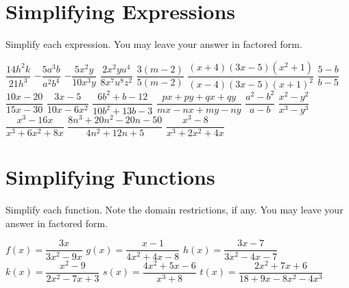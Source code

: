 \section*{Simplifying Expressions}
Simplify each expression.  You may leave your answer in factored form.
\begin{smenum}
\mitemxxxx
{$\dfrac{14h^2k}{21h^3}$}
{$-\dfrac{5a^3b}{a^2b^4}$}
{$-\dfrac{5x^2y}{10x^3y}$}
{$\dfrac{2x^2yu^4}{8x^7u^8z^2}$}
\mitemxxx
{$\dfrac{3(m-2)}{5(m-2)}$}
{$\dfrac{(x+4)(3x-5)(x^2+1)}{(x-4)(3x-5)(x+1)^2}$}
{$\dfrac{5-b}{b-5}$}
\mitemxxx
{$\dfrac{10x-20}{15x-30}$}
{$\dfrac{3x-5}{10x-6x^2}$}
{$\dfrac{6b^2+b-12}{10b^2+13b-3}$}
\mitemxxx
{$\dfrac{px+py+qx+qy}{mx-nx+my-ny}$}
{$\dfrac{a^2-b^2}{a-b}$}
{$\dfrac{x^2-y^2}{x^3-y^3}$}
\mitemxxx
{$\dfrac{x^3-16x}{x^3+6x^2+8x}$}
{$\dfrac{8n^3+20n^2-20n-50}{4n^2+12n+5}$}
{$\dfrac{x^3-8}{x^3+2x^2+4x}$}
\end{smenum}

\section*{Simplifying Functions}
Simplify each function.  Note the domain restrictions, if any. You may leave your answer in factored form.
\begin{smenum}
\mitemxxx
{$f(x)=\dfrac{3x}{3x^2-9x}$}
{$g(x)=\dfrac{x-1}{4x^2+4x-8}$}
{$h(x)=\dfrac{3x-7}{3x^2-4x-7}$}
\mitemxxx
{$k(x)=\dfrac{x^2-9}{2x^2-7x+3}$}
{$s(x)=\dfrac{4x^2+5x-6}{x^3+8}$}
{$t(x)=\dfrac{2x^2+7x+6}{18+9x-8x^2-4x^3}$}
\end{smenum}


